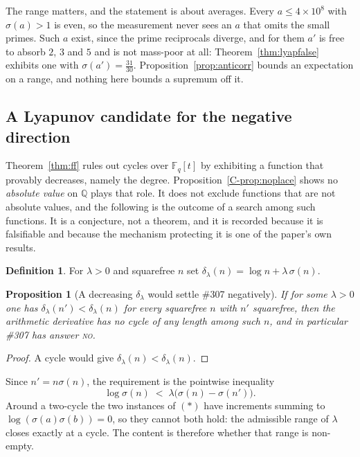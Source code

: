 \documentclass[11pt]{article}
\newtheorem{proposition}[theorem]{Proposition}
\theoremstyle{definition}
\newtheorem{definition}[theorem]{Definition}
\begin{document}
The range matters, and the statement is about averages. Every $a\le4\times10^8$ with $\sigma(a)>1$
is even, so the measurement never sees an $a$ that omits the small primes. Such $a$ exist, since the
prime reciprocals diverge, and for them $a'$ is free to absorb $2$, $3$ and $5$ and is not mass-poor
at all: Theorem~\ref{thm:lyapfalse} exhibits one with $\sigma(a')=\tfrac{31}{30}$. Proposition~\ref{prop:anticorr}
bounds an expectation on a range, and nothing here bounds a supremum off it.

\subsection*{A Lyapunov candidate for the negative direction}

Theorem~\ref{thm:ff} rules out cycles over $\mathbb{F}_q[t]$ by exhibiting a function that provably
decreases, namely the degree. Proposition~\ref{C-prop:noplace} shows no \emph{absolute value} on
$\mathbb{Q}$ plays that role. It does not exclude functions that are not absolute values, and the
following is the outcome of a search among such functions. It is a conjecture, not a theorem, and it
is recorded because it is falsifiable and because the mechanism protecting it is one of the paper's
own results.

\begin{definition}\label{def:lyap}
For $\lambda>0$ and squarefree $n$ set $\delta_\lambda(n)=\log n+\lambda\,\sigma(n)$.
\end{definition}

\begin{proposition}[A decreasing $\delta_\lambda$ would settle \#307 negatively]\label{prop:lyapworks}
If for some $\lambda>0$ one has $\delta_\lambda(n')<\delta_\lambda(n)$ for every squarefree $n$ with
$n'$ squarefree, then the arithmetic derivative has no cycle of any length among such $n$, and in
particular \#307 has answer \textsc{no}.
\end{proposition}
\begin{proof}
A cycle would give $\delta_\lambda(n)<\delta_\lambda(n)$.
\end{proof}

Since $n'=n\sigma(n)$, the requirement is the pointwise inequality
\[ \log\sigma(n)\;<\;\lambda\bigl(\sigma(n)-\sigma(n')\bigr). \tag{$\ast$} \]
Around a two-cycle the two instances of $(\ast)$ have increments summing to
$\log(\sigma(a)\sigma(b))=0$, so they cannot both hold: the admissible range of $\lambda$ closes
exactly at a cycle. The content is therefore whether that range is non-empty.
\end{document}

